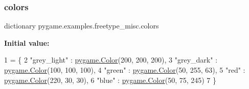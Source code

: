 \subsubsection{\texorpdfstring{colors}{colors}}
{\footnotesize\ttfamily dictionary pygame.\+examples.\+freetype\+\_\+misc.\+colors}

{\bfseries Initial value\+:}
\begin{DoxyCode}
1 =  \{
2     \textcolor{stringliteral}{"grey\_light"}    :   \hyperlink{namespacepygame_ad27cf54b626cb073b189d7171af414fb}{pygame.Color}(200, 200, 200),
3     \textcolor{stringliteral}{"grey\_dark"}     :   \hyperlink{namespacepygame_ad27cf54b626cb073b189d7171af414fb}{pygame.Color}(100, 100, 100),
4     \textcolor{stringliteral}{"green"}         :   \hyperlink{namespacepygame_ad27cf54b626cb073b189d7171af414fb}{pygame.Color}(50, 255, 63),
5     \textcolor{stringliteral}{"red"}           :   \hyperlink{namespacepygame_ad27cf54b626cb073b189d7171af414fb}{pygame.Color}(220, 30, 30),
6     \textcolor{stringliteral}{"blue"}          :   \hyperlink{namespacepygame_ad27cf54b626cb073b189d7171af414fb}{pygame.Color}(50, 75, 245)
7 \}
\end{DoxyCode}
